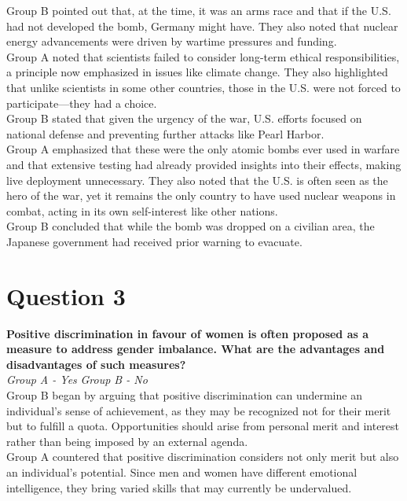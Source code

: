 \documentclass[12pt]{article}
\begin{document}
Group B pointed out that, at the time, it was an arms race and that if the U.S. had not developed the bomb, Germany might have. They also noted that nuclear energy advancements were driven by wartime pressures and funding.\\

Group A noted that scientists failed to consider long-term ethical responsibilities, a principle now emphasized in issues like climate change. They also highlighted that unlike scientists in some other countries, those in the U.S. were not forced to participate—they had a choice.\\

Group B stated that given the urgency of the war, U.S. efforts focused on national defense and preventing further attacks like Pearl Harbor.\\

Group A emphasized that these were the only atomic bombs ever used in warfare and that extensive testing had already provided insights into their effects, making live deployment unnecessary. They also noted that the U.S. is often seen as the hero of the war, yet it remains the only country to have used nuclear weapons in combat, acting in its own self-interest like other nations.\\

Group B concluded that while the bomb was dropped on a civilian area, the Japanese government had received prior warning to evacuate.\\

\pagebreak
\section{Question 3}
\textbf{Positive discrimination in favour of women is often proposed as a measure to address gender imbalance. What are the advantages and disadvantages of such measures?}\\
\textit {Group A - Yes}
\textit {Group B - No}\\

Group B began by arguing that positive discrimination can undermine an individual’s sense of achievement, as they may be recognized not for their merit but to fulfill a quota. Opportunities should arise from personal merit and interest rather than being imposed by an external agenda.\\

Group A countered that positive discrimination considers not only merit but also an individual’s potential. Since men and women have different emotional intelligence, they bring varied skills that may currently be undervalued.\\
\end{document}
